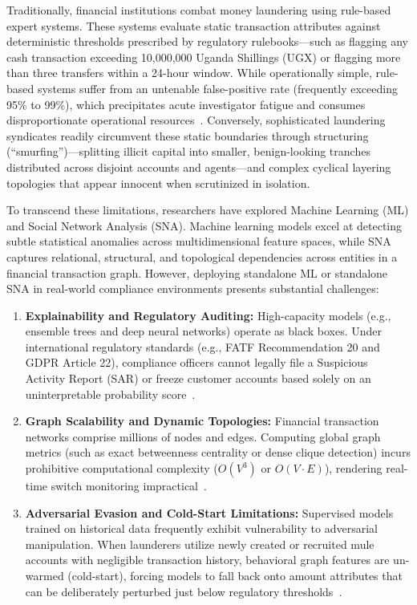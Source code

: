 Traditionally, financial institutions combat money laundering using rule-based expert systems. These systems evaluate static transaction attributes against deterministic thresholds prescribed by regulatory rulebooks---such as flagging any cash transaction exceeding 10,000,000 Uganda Shillings (UGX) or flagging more than three transfers within a 24-hour window. While operationally simple, rule-based systems suffer from an untenable false-positive rate (frequently exceeding 95\% to 99\%), which precipitates acute investigator fatigue and consumes disproportionate operational resources~\cite{bellomarini2020rule, harris2022using}. Conversely, sophisticated laundering syndicates readily circumvent these static boundaries through structuring (``smurfing'')---splitting illicit capital into smaller, benign-looking tranches distributed across disjoint accounts and agents---and complex cyclical layering topologies that appear innocent when scrutinized in isolation.

To transcend these limitations, researchers have explored Machine Learning (ML) and Social Network Analysis (SNA). Machine learning models excel at detecting subtle statistical anomalies across multidimensional feature spaces, while SNA captures relational, structural, and topological dependencies across entities in a financial transaction graph. However, deploying standalone ML or standalone SNA in real-world compliance environments presents substantial challenges:
\begin{enumerate}
    \item \textbf{Explainability and Regulatory Auditing:} High-capacity models (e.g., ensemble trees and deep neural networks) operate as black boxes. Under international regulatory standards (e.g., FATF Recommendation 20 and GDPR Article 22), compliance officers cannot legally file a Suspicious Activity Report (SAR) or freeze customer accounts based solely on an uninterpretable probability score~\cite{ribeiro2016why, lundberg2020local}.
    \item \textbf{Graph Scalability and Dynamic Topologies:} Financial transaction networks comprise millions of nodes and edges. Computing global graph metrics (such as exact betweenness centrality or dense clique detection) incurs prohibitive computational complexity ($O(V^3)$ or $O(V \cdot E)$), rendering real-time switch monitoring impractical~\cite{kim2011network, brandes2001faster}.
    \item \textbf{Adversarial Evasion and Cold-Start Limitations:} Supervised models trained on historical data frequently exhibit vulnerability to adversarial manipulation. When launderers utilize newly created or recruited mule accounts with negligible transaction history, behavioral graph features are un-warmed (cold-start), forcing models to fall back onto amount attributes that can be deliberately perturbed just below regulatory thresholds~\cite{goodfellow2014explaining}.
\end{enumerate}

